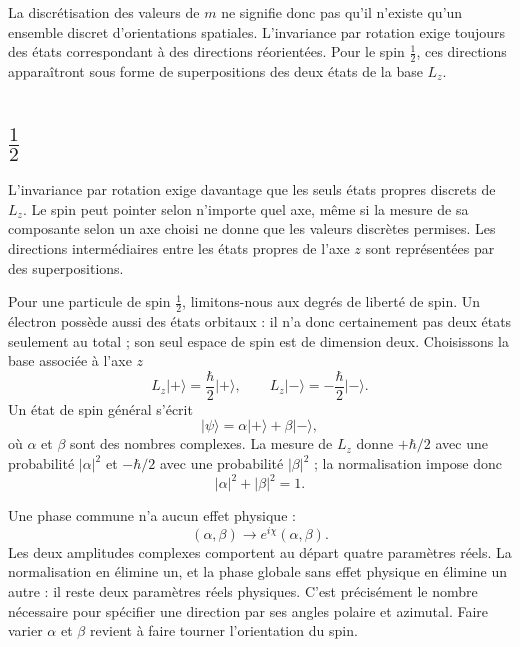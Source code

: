 La discrétisation des valeurs de \(m\) ne signifie donc pas qu’il n’existe qu’un ensemble discret d’orientations spatiales. L’invariance par rotation exige toujours des états correspondant à des directions réorientées. Pour le spin \(\tfrac12\), ces directions apparaîtront sous forme de superpositions des deux états de la base \(L_z\).

\section{\texorpdfstring{\(\tfrac12\)}{/12 : états et orientation}}

L’invariance par rotation exige davantage que les seuls états propres discrets de \(L_z\). Le spin peut pointer selon n’importe quel axe, même si la mesure de sa composante selon un axe choisi ne donne que les valeurs discrètes permises. Les directions intermédiaires entre les états propres de l’axe \(z\) sont représentées par des superpositions.

Pour une particule de spin \(\tfrac12\), limitons-nous aux degrés de liberté de spin. Un électron possède aussi des états orbitaux : il n’a donc certainement pas deux états seulement au total ; son seul espace de spin est de dimension deux. Choisissons la base associée à l’axe \(z\)
\begin{equation}
L_z\lvert+\rangle=\frac{\hbar}{2}\lvert+\rangle,
\qquad
L_z\lvert-\rangle=-\frac{\hbar}{2}\lvert-\rangle.
\end{equation}
Un état de spin général s’écrit
\begin{equation}
\lvert\psi\rangle
=
\alpha\lvert+\rangle+\beta\lvert-\rangle,
\end{equation}
où \(\alpha\) et \(\beta\) sont des nombres complexes. La mesure de \(L_z\) donne \(+\hbar/2\) avec une probabilité \(|\alpha|^2\) et \(-\hbar/2\) avec une probabilité \(|\beta|^2\) ; la normalisation impose donc
\begin{equation}
|\alpha|^2+|\beta|^2=1.
\end{equation}

Une phase commune n’a aucun effet physique :
\begin{equation}
(\alpha,\beta)\longrightarrow
e^{i\chi}(\alpha,\beta).
\end{equation}
Les deux amplitudes complexes comportent au départ quatre paramètres réels. La normalisation en élimine un, et la phase globale sans effet physique en élimine un autre : il reste deux paramètres réels physiques. C’est précisément le nombre nécessaire pour spécifier une direction par ses angles polaire et azimutal. Faire varier \(\alpha\) et \(\beta\) revient à faire tourner l’orientation du spin.

